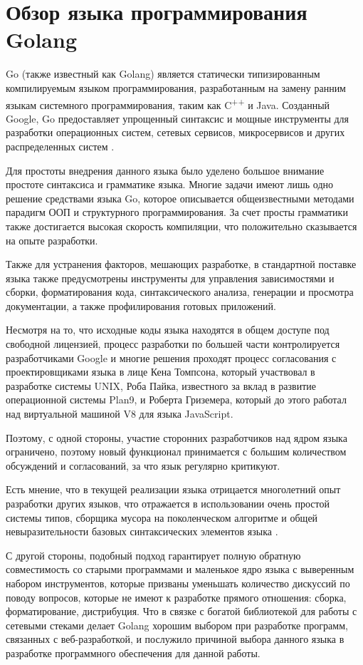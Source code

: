 \section{Обзор языка программирования Golang }

Go (также известный как Golang) является статически типизированным компилируемым языком программирования, разработанным на замену ранним языкам системного программирования, таким как C\textsuperscript{++} и Java. Созданный Google, Go предоставляет упрощенный синтаксис и мощные инструменты для разработки операционных систем, сетевых сервисов, микросервисов и других распределенных систем \cite{golang}.

Для простоты внедрения данного языка было уделено большое внимание простоте синтаксиса и грамматике языка. Многие задачи имеют лишь одно решение средствами языка Go, которое описывается общеизвестными методами парадигм ООП и структурного программирования. За счет просты грамматики также достигается высокая скорость компиляции, что положительно сказывается на опыте разработки.

Также для устранения факторов, мешающих разработке, в стандартной поставке языка также предусмотрены инструменты для управления зависимостями и сборки, форматирования кода, синтаксического анализа, генерации и просмотра документации, а также профилирования готовых приложений.

Несмотря на то, что исходные коды языка находятся в общем доступе под свободной лицензией, процесс разработки по большей части контролируется разработчиками Google и многие решения проходят процесс согласования с проектировщиками языка в лице Кена Томпсона, который участвовал в разработке системы UNIX, Роба Пайка, известного за вклад в развитие операционной системы Plan9, и Роберта Гриземера, который до этого работал над виртуальной машиной V8 для языка JavaScript.

Поэтому, с одной стороны, участие сторонних разработчиков над ядром языка ограничено, поэтому новый функционал принимается с большим количеством обсуждений и согласований, за что язык регулярно критикуют.

Есть мнение, что в текущей реализации языка отрицается многолетний опыт разработки других языков, что отражается в использовании очень простой системы типов, сборщика мусора на поколенческом алгоритме и общей невыразительности базовых синтаксических элементов языка .

С другой стороны, подобный подход гарантирует полную обратную совместимость со старыми программами и маленькое ядро языка с выверенным набором инструментов, которые призваны уменьшать количество дискуссий по поводу вопросов, которые не имеют к разработке прямого отношения: сборка, форматирование, дистрибуция. Что в связке с богатой библиотекой для работы с сетевыми стеками делает Golang хорошим выбором при разработке программ, связанных с веб-разработкой, и послужило причиной выбора данного языка в разработке программного обеспечения для данной работы.